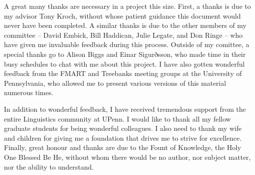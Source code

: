 \begin{singlespace}

	A great many thanks are necessary in a project this size. First, a thanks is due to my advisor Tony Kroch, without whose patient guidance this document would never have been completed. A similar thanks is due to the other members of my committee -- David Embick, Bill Haddican, Julie Legate, and Don Ringe -- who have given me invaluable feedback during this process. Outside of my comittee, a special thanks go to Alison Biggs and Einar Sigurðsson, who made time in their busy schedules to chat with me about this project. I have also gotten wonderful feedback from the FMART and Treebanks meeting groups at the University of Pennsylvania, who allowed me to present various versions of this material numerous times.

	In addition to wonderful feedback, I have received tremendous support from the entire Linguistics community at UPenn. I would like to thank all my fellow graduate students for being wonderful colleagues. I also need to thank my wife and children for giving me a foundation that drives me to strive for excellence. Finally, great honour and thanks are due to the Fount of Knowledge, the Holy One Blessed Be He, without whom there would be no author, nor subject matter, nor the ability to understand. 

\end{singlespace}
